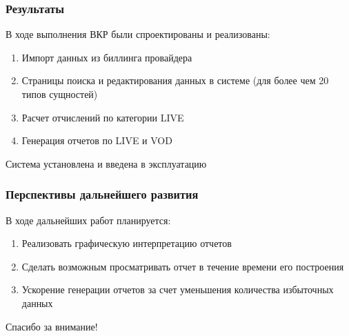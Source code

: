 \documentclass{beamer}
\begin{document}
\begin{frame}
\frametitle{Результаты}
В ходе выполнения ВКР были спроектированы и реализованы:
\begin{enumerate}
\item {
Импорт данных из биллинга провайдера
}
\item {
Страницы поиска и редактирования данных в системе (для более чем 20 типов сущностей)
}
\item {
Расчет отчислений по категории LIVE
}
\item {
Генерация отчетов по LIVE и VOD
}
\end{enumerate}


Система установлена и введена в эксплуатацию

\end{frame}

\begin{frame}
\frametitle{Перспективы дальнейшего развития}
В ходе дальнейших работ планируется:
\begin{enumerate}
\item {
Реализовать графическую интерпретацию отчетов
}
\item {
Сделать возможным просматривать отчет в течение времени его построения
}
\item {
Ускорение генерации отчетов за счет уменьшения количества избыточных данных
}
\end{enumerate}


\end{frame}


\begin{frame}
{\Large Спасибо за внимание!}
\end{frame}
\end{document}
